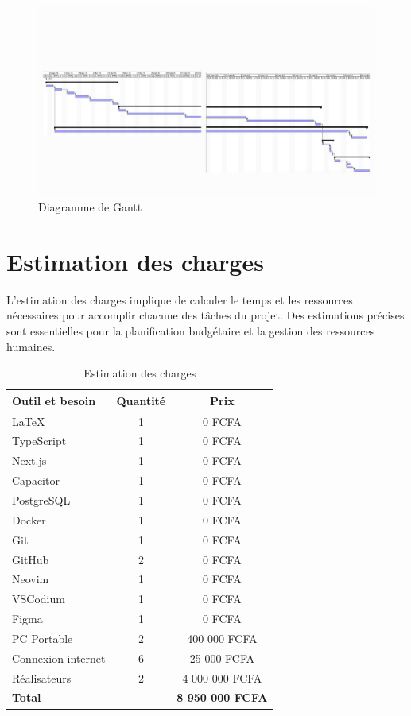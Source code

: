 \begin{figure}[H]
  \centering
  \includegraphics[width=1\textwidth]{capture/gantt.png}
  \caption{Diagramme de Gantt}
\end{figure}



\section{Estimation des charges}
L’estimation des charges implique de calculer le temps et les ressources
nécessaires pour accomplir chacune des tâches du projet.
Des estimations précises sont essentielles pour la planification budgétaire et
la gestion des ressources humaines.


\begin{table}[htbp]
  \centering
  \begin{tabular}{|l|c|c|}
    \hline
    \textbf{Outil et besoin} & \textbf{Quantité} & \textbf{Prix} \\ \hline
    \LaTeX & 1 & 0 FCFA  \\ \hline
    TypeScript & 1 & 0 FCFA  \\ \hline
    Next.js & 1 & 0 FCFA  \\ \hline
    Capacitor & 1 & 0 FCFA  \\ \hline
    PostgreSQL & 1 & 0 FCFA  \\ \hline
    Docker & 1 & 0 FCFA  \\ \hline
    Git & 1 & 0 FCFA  \\ \hline
    GitHub & 2 & 0 FCFA  \\ \hline
    Neovim & 1 & 0 FCFA  \\ \hline
    VSCodium & 1 & 0 FCFA  \\ \hline
    Figma & 1 & 0 FCFA  \\ \hline
    PC Portable & 2 & 400 000 FCFA  \\ \hline
    Connexion internet & 6 & 25 000 FCFA \\ \hline
    Réalisateurs & 2 & 4 000 000 FCFA \\ \hline
    \multicolumn{2}{|l|}{\textbf{Total}} & \textbf{8 950 000 FCFA} \\ \hline
  \end{tabular}
  \caption{Estimation des charges}
\end{table}

